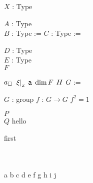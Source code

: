 \documentclass[dvipdfmx]{jsarticle}
\begin{document}
\begin{When}
\itemwhen
  \Fix \(X\) : Type
\end{When}

\begin{Definition}
\itemdefi
  \For \(A\) : Type \\
  \Define \(B\) : Type := 
\itemdefi
  \Define \(C\) : Type :=
  \begin{indentblock}
    \Let \(D\) : Type \\
    \Take \(E\) : Type \\
    \Return \(F\)
  \end{indentblock}
\itemdefi
  \(a_{\square}\)
\itemdefi
  \(\left. {\xi} \right| _{x}\)
\itemdefi
  \(\texttt{a}\)
\itemdefi
  \(\text{dim} \, {F}\)
\itemdefi
  \(H\)
\itemdefi
  \Define \(G\) :=
  \begin{itemize}
    \itembase \(G\) : group
    \itemenum \(f\) : \(G \to G\)
    \itemwith \(f^2 = 1\)
  \end{itemize}
\end{Definition}

\begin{Theorem}
\itemprop
  \IfHold \(P\) \\
  \Then \(Q\)
\itemnote
  hello
\end{Theorem}

\begin{Proof}
\itemprof
  first
\itemthen
  \WIP \\
  \SORRY \\
  \ADMIT \\
\end{Proof}

\begin{TestPage}[hello]
\itemenum a
\itemenum b
\itemenum c
\itemenum d
\itemenum e
\itemenum f
\itemenum g
\itemenum h
\itemenum i
\itemenum j
\end{TestPage}
\end{document}
